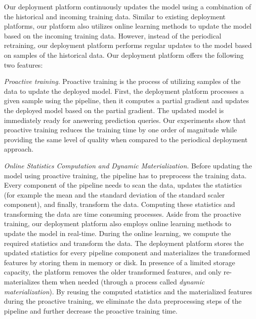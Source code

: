 
Our deployment platform continuously updates the model using a combination of the historical and incoming training data.
Similar to existing deployment platforms, our platform also utilizes online learning methods to update the model based on the incoming training data.
However, instead of the periodical retraining, our deployment platform performs regular updates to the model based on samples of the historical data.
Our deployment platform offers the following two features:

\textit{Proactive training.}
Proactive training is the process of utilizing samples of the data to update the deployed model.
First, the deployment platform processes a given sample using the pipeline, then it computes a partial gradient and updates the deployed model based on the partial gradient.
The updated model is immediately ready for answering prediction queries.
Our experiments show that proactive training reduces the training time by one order of magnitude while providing the same level of quality when compared to the periodical deployment approach.

\textit{Online Statistics Computation and Dynamic Materialization.}
Before updating the model using proactive training, the pipeline has to preprocess the training data.
Every component of the pipeline needs to scan the data, updates the statistics (for example the mean and the standard deviation of the standard scaler component), and finally, transform the data.
Computing these statistics and transforming the data are time consuming processes.
Aside from the proactive training, our deployment platform also employs online learning methods to update the model in real-time.
During the online learning, we compute the required statistics and transform the data.
The deployment platform stores the updated statistics for every pipeline component and materializes the transformed features by storing them in memory or disk.
In presence of a limited storage capacity, the platform removes the older transformed features, and only re-materializes them when needed (through a process called \textit{dynamic materialization}).
By reusing the computed statistics and the materialized features during the proactive training, we eliminate the data preprocessing steps of the pipeline and further decrease the proactive training time.


